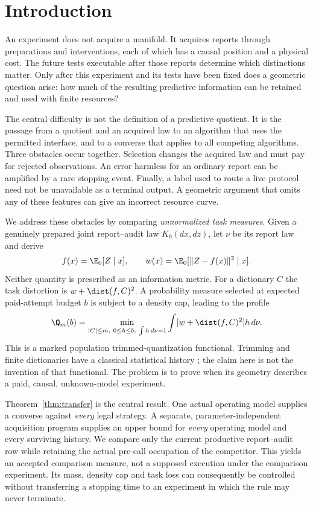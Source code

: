 \section{Introduction}
An experiment does not acquire a manifold. It acquires reports through preparations and interventions, each of which has a causal position and a physical cost. The future tests executable after those reports determine which distinctions matter. Only after this experiment and its tests have been fixed does a geometric question arise: how much of the resulting predictive information can be retained and used with finite resources?

The central difficulty is not the definition of a predictive quotient. It is the passage from a quotient and an acquired law to an algorithm that uses the permitted interface, and to a converse that applies to all competing algorithms. Three obstacles occur together. Selection changes the acquired law and must pay for rejected observations. An error harmless for an ordinary report can be amplified by a rare stopping event. Finally, a label used to route a live protocol need not be unavailable as a terminal output. A geometric argument that omits any of these features can give an incorrect resource curve.

We address these obstacles by comparing \emph{unnormalized task measures}. Given a genuinely prepared joint report--audit law $K_0(dx,dz)$, let $\nu$ be its report law and derive
\[
 f(x)=\E_0[Z\mid x],\qquad w(x)=\E_0[\|Z-f(x)\|^2\mid x].
\]
Neither quantity is prescribed as an information metric. For a dictionary $C$ the task distortion is $w+\dist(f,C)^2$. A probability measure selected at expected paid-attempt budget $b$ is subject to a density cap, leading to the profile
\begin{equation}\label{eq:intro-profile}
 \Q_m(b)=\min_{|C|\le m,\ 0\le h\le b,\ \int h\,d\nu=1}
       \int [w+\dist(f,C)^2]h\,d\nu.
\end{equation}
This is a marked population trimmed-quantization functional. Trimming and finite dictionaries have a classical statistical history \cite{CGM97,GG99}; the claim here is not the invention of that functional. The problem is to prove when its geometry describes a paid, causal, unknown-model experiment.

Theorem~\ref{thm:transfer} is the central result. One actual operating model supplies a converse against \emph{every} legal strategy. A separate, parameter-independent acquisition program supplies an upper bound for \emph{every} operating model and every surviving history. We compare only the current productive report--audit row while retaining the actual pre-call occupation of the competitor. This yields an accepted comparison measure, not a supposed execution under the comparison experiment. Its mass, density cap and task loss can consequently be controlled without transferring a stopping time to an experiment in which the rule may never terminate.

